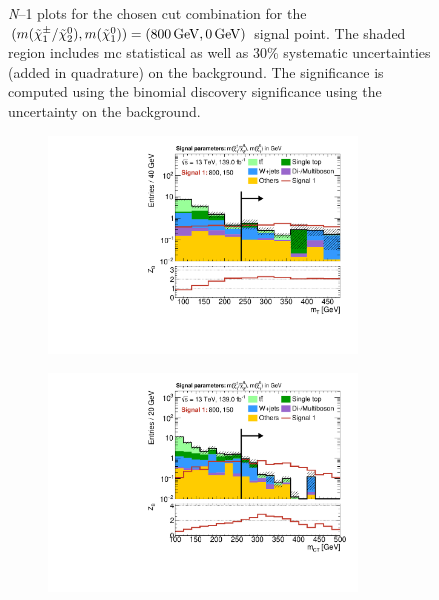 \begin{figure}
	\caption[\textit{N}--1 plots for the chosen cut combination for the (800, 0) signal point]{\textit{N}--1 plots for the chosen cut combination for the $(m(\charg/\neutr), m(\lsp)) = (\SI{800}{\GeV}, \SI{0}{\GeV})$ signal point. The shaded region includes \gls{mc} statistical as well as 30\% systematic uncertainties (added in quadrature) on the background. The significance is computed using the binomial discovery significance using the uncertainty on the background.}
	\label{fig:results_n1_800_0}
\end{figure}



\begin{figure}
	\centering
	\begin{subfigure}[b]{0.5\linewidth}
		\centering\includegraphics[width=0.9\textwidth]{N-1_cut_scan/n1_800_150/mt}
	\end{subfigure}\hfill
	\begin{subfigure}[b]{0.5\linewidth}
		\centering\includegraphics[width=0.9\textwidth]{N-1_cut_scan/n1_800_150/mct}

\end{subfigure}
\end{figure}
